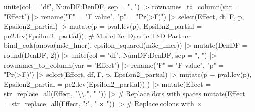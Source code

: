 \documentclass[
  bookmarksnumbered]{article}
\newenvironment{Shaded}{\begin{snugshade}}{\end{snugshade}}
\newcommand{\AttributeTok}[1]{\textcolor[rgb]{0.80,0.80,0.80}{#1}}
\newcommand{\CommentTok}[1]{\textcolor[rgb]{0.50,0.62,0.50}{#1}}
\newcommand{\DecValTok}[1]{\textcolor[rgb]{0.86,0.86,0.80}{#1}}
\newcommand{\FunctionTok}[1]{\textcolor[rgb]{0.94,0.94,0.56}{#1}}
\newcommand{\NormalTok}[1]{\textcolor[rgb]{0.80,0.80,0.80}{#1}}
\newcommand{\OtherTok}[1]{\textcolor[rgb]{0.94,0.94,0.56}{#1}}
\newcommand{\SpecialCharTok}[1]{\textcolor[rgb]{0.86,0.64,0.64}{#1}}
\newcommand{\StringTok}[1]{\textcolor[rgb]{0.80,0.58,0.58}{#1}}
\begin{document}
\begin{Shaded}
\begin{Highlighting}[]
    \FunctionTok{unite}\NormalTok{(}\AttributeTok{col =} \StringTok{"df"}\NormalTok{, NumDF}\SpecialCharTok{:}\NormalTok{DenDF, }\AttributeTok{sep =} \StringTok{", "}\NormalTok{) }\SpecialCharTok{|\textgreater{}}
    \FunctionTok{rownames\_to\_column}\NormalTok{(}\AttributeTok{var =} \StringTok{"Effect"}\NormalTok{) }\SpecialCharTok{|\textgreater{}}
    \FunctionTok{rename}\NormalTok{(}\StringTok{"F"} \OtherTok{=} \StringTok{"F value"}\NormalTok{, }\StringTok{"p"} \OtherTok{=} \StringTok{"Pr(\textgreater{}F)"}\NormalTok{) }\SpecialCharTok{|\textgreater{}}
    \FunctionTok{select}\NormalTok{(Effect, df, F, p, Epsilon2\_partial) }\SpecialCharTok{|\textgreater{}}
    \FunctionTok{mutate}\NormalTok{(}\AttributeTok{p =} \FunctionTok{pval.lev}\NormalTok{(p), }\AttributeTok{Epsilon2\_partial =} \FunctionTok{pe2.lev}\NormalTok{(Epsilon2\_partial)),}
  \CommentTok{\# Model 3c: Dyadic TSD Partner}
  \FunctionTok{bind\_cols}\NormalTok{(}\FunctionTok{anova}\NormalTok{(m3c\_lmer), }\FunctionTok{epsilon\_squared}\NormalTok{(m3c\_lmer)) }\SpecialCharTok{|\textgreater{}}
    \FunctionTok{mutate}\NormalTok{(}\AttributeTok{DenDF =} \FunctionTok{round}\NormalTok{(DenDF, }\DecValTok{2}\NormalTok{)) }\SpecialCharTok{|\textgreater{}}
    \FunctionTok{unite}\NormalTok{(}\AttributeTok{col =} \StringTok{"df"}\NormalTok{, NumDF}\SpecialCharTok{:}\NormalTok{DenDF, }\AttributeTok{sep =} \StringTok{", "}\NormalTok{) }\SpecialCharTok{|\textgreater{}}
    \FunctionTok{rownames\_to\_column}\NormalTok{(}\AttributeTok{var =} \StringTok{"Effect"}\NormalTok{) }\SpecialCharTok{|\textgreater{}}
    \FunctionTok{rename}\NormalTok{(}\StringTok{"F"} \OtherTok{=} \StringTok{"F value"}\NormalTok{, }\StringTok{"p"} \OtherTok{=} \StringTok{"Pr(\textgreater{}F)"}\NormalTok{) }\SpecialCharTok{|\textgreater{}}
    \FunctionTok{select}\NormalTok{(Effect, df, F, p, Epsilon2\_partial) }\SpecialCharTok{|\textgreater{}}
    \FunctionTok{mutate}\NormalTok{(}\AttributeTok{p =} \FunctionTok{pval.lev}\NormalTok{(p), }\AttributeTok{Epsilon2\_partial =} \FunctionTok{pe2.lev}\NormalTok{(Epsilon2\_partial))}
\NormalTok{) }\SpecialCharTok{|\textgreater{}}
  \FunctionTok{mutate}\NormalTok{(}\AttributeTok{Effect =} \FunctionTok{str\_replace\_all}\NormalTok{(Effect, }\StringTok{"}\SpecialCharTok{\textbackslash{}\textbackslash{}}\StringTok{."}\NormalTok{, }\StringTok{" "}\NormalTok{)) }\SpecialCharTok{|\textgreater{}} \CommentTok{\# Replace dots with spaces}
  \FunctionTok{mutate}\NormalTok{(}\AttributeTok{Effect =} \FunctionTok{str\_replace\_all}\NormalTok{(Effect, }\StringTok{":"}\NormalTok{, }\StringTok{" × "}\NormalTok{)) }\SpecialCharTok{|\textgreater{}} \CommentTok{\# Replace colons with ×}

\end{Highlighting}
\end{Shaded}
\end{document}
